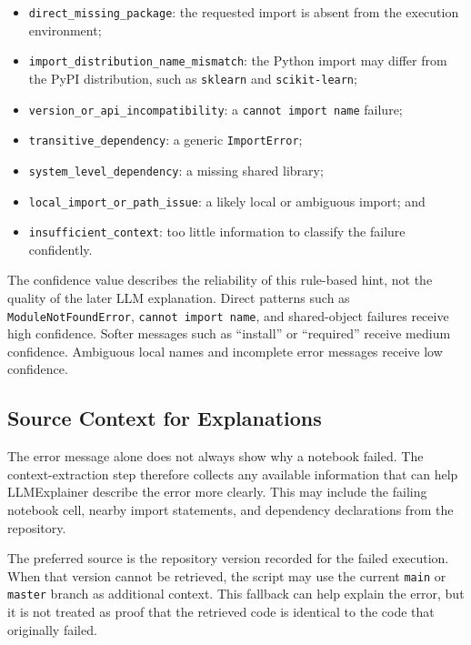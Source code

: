 \begin{itemize}
  \item \texttt{direct\_missing\_package}: the requested import is absent
        from the execution environment;
  \item \texttt{import\_distribution\_name\_mismatch}: the Python import
        may differ from the PyPI distribution, such as \texttt{sklearn} and
        \texttt{scikit-learn};
  \item \texttt{version\_or\_api\_incompatibility}: a
        \texttt{cannot import name} failure;
  \item \texttt{transitive\_dependency}: a generic \texttt{ImportError};
  \item \texttt{system\_level\_dependency}: a missing shared library;
  \item \texttt{local\_import\_or\_path\_issue}: a likely local or ambiguous
        import; and
  \item \texttt{insufficient\_context}: too little information to classify
        the failure confidently.
\end{itemize}

The confidence value describes the reliability of this rule-based hint, not
the quality of the later LLM explanation. Direct patterns such as
\texttt{ModuleNotFoundError}, \texttt{cannot import name}, and shared-object
failures receive high confidence. Softer messages such as ``install'' or
``required'' receive medium confidence. Ambiguous local names and incomplete
error messages receive low confidence.

\subsection{Source Context for Explanations}

The error message alone does not always show why a notebook failed. The
context-extraction step therefore collects any available information that can
help LLMExplainer describe the error more clearly. This may include the
failing notebook cell, nearby import statements, and dependency declarations
from the repository.

The preferred source is the repository version recorded for the failed
execution. When that version cannot be retrieved, the script may use the
current \texttt{main} or \texttt{master} branch as additional context. This
fallback can help explain the error, but it is not treated as proof that the
retrieved code is identical to the code that originally failed.

